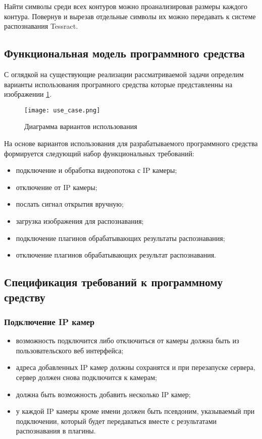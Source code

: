 Найти символы среди всех контуров можно проанализировав размеры каждого контура. Повернув и вырезав отдельные символы их можно передавать к системе распознавания Tessract. 

\subsection{Функциональная модель программного средства}
\label{sec:funcreq:funcmodel}

С оглядкой на существующие реализации рассматриваемой задачи определим варианты использования програмного средства которые представленны на изображении \ref{fig:funcreq:funcmodel}.

\begin{figure}[p]
\centering
    \texttt{[image: use\_case.png]}  
    \caption{Диаграмма вариантов использования}
  \label{fig:funcreq:funcmodel}
\end{figure}

На основе вариантов использования для разрабатываемого программного средства формируется следующий набор функциональных требований:
\begin{itemize}
	\item подключение и обработка видеопотока с IP камеры;
  \item отключение от IP камеры;
	\item послать сигнал открытия вручную;
	\item загрузка изображения для распознавания;
	\item подключение плагинов обрабатывающих результаты распознавания;
	\item отключение плагинов обрабатывающих результат распознавания.
\end{itemize}

\subsection{Спецификация требований к программному средству}
\label{sec:fucreq:specification}

\subsubsection{Подключение IP камер}
\begin{itemize}
	\item возможность подключится либо отключиться от камеры должна быть из пользовательского веб интерфейса;
	\item адреса добавленных IP камер должны сохранятся и при перезапуске сервера, сервер должен снова подключится к камерам;
	\item должна быть возможность добавить несколько IP камер;
	\item у каждой IP камеры кроме имени должен быть псевдоним, указываемый при подключении, который будет передаваться вместе с результатами распознавания в плагины.
\end{itemize}

